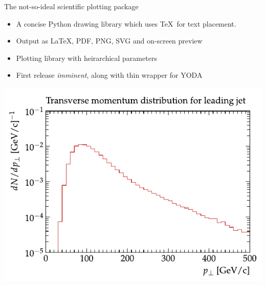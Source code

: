 \documentclass{beamer}
\begin{document}
  \begin{frame}{The not-so-ideal scientific plotting package}
    
    \begin{itemize}[<uncover@+>]
      \item A concise Python drawing library which uses \TeX\ for text placement.
      \item Output as \LaTeX, PDF, PNG, SVG and on-screen preview
      \item Plotting library with heirarchical parameters
      \item First release {\em imminent}, along with thin wrapper for YODA
    \end{itemize}
  \end{frame}
  \begin{frame}
    \includegraphics[width=\textwidth]{daveplot}
  \end{frame}
\end{document}
